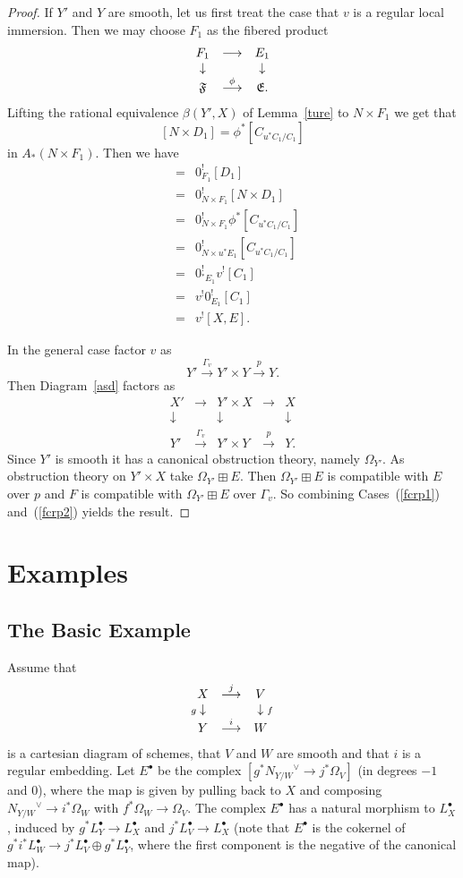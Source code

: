 \documentclass[11pt]{article}
\theoremstyle{plain}
\theoremstyle{definition}
\newenvironment{pf}{\begin{proof}}{\end{proof}}
\newcommand{\dual}[1]{{{#1}^{\vee}}}
\newcommand{\upst}{^{\ast}}
\newcommand{\upsh}{^{!}}
\newcommand{\lst}{_{\ast}}
\newcommand{\com}{^{\scriptscriptstyle\bullet}}
\newcommand{\EE}{{\mathfrak{E}}}
\newcommand{\FF}{{\mathfrak{F}}}
\newcommand{\ldiag}[1]
       {\makebox[0cm]{\({\scriptstyle#1}\downarrow\phantom{\scriptstyle#1}\)}}
\newcommand{\rdiag}[1]
       {\makebox[0cm]{\(\phantom{\scriptstyle#1}\downarrow{\scriptstyle#1}\)}}
\newcommand{\comdia}[9]{
\begin{array}{ccc}
#1 & \stackrel{#2}{\longrightarrow} & #3 \\
\ldiag{#4} & #5 & \rdiag{#6} \\
#7 & \stackrel{#8}{\longrightarrow} & #9
\end{array}}
\theoremstyle{plain}
\theoremstyle{definition}
\theoremstyle{remark}
\begin{document}
\begin{pf}
If \(Y'\) and \(Y\) are smooth, let us first treat the case that \(v\) is a
regular local immersion. Then we may choose \(F_1\) as the fibered
product
\[
\comdia{F_1}{}{E_1}{}{}{}{\FF}{\phi}{\EE.}
\]
Lifting the rational equivalence \(\beta(Y',X)\) of Lemma~\ref{ture} to
\(N\times F_1\) we get that
\[
[N\times D_1]=\phi\upst[C_{u\upst C_1/C_1}]
\]
in \(A\lst(N\times F_1)\). Then we have
\begin{eqnarray*}
[X',F_1] & = & 0_{F_1}\upsh[D_1] \\
         & = & 0_{N\times F_1}\upsh[N\times D_1] \\
         & = & 0_{N\times F_1}\upsh\phi\upst[C_{u\upst C_1/C_1}] \\
         & = & 0_{N\times u\upst E_1}\upsh[C_{u\upst C_1/C_1}] \\
         & = & 0_{\upst E_1}\upsh v\upsh[C_1] \\
         & = & v\upsh 0_{E_1}\upsh [C_1] \\
         & = & v\upsh [X,E].
\end{eqnarray*}

In the general case factor \(v\) as
\[
Y'\stackrel{\Gamma_v}{\longrightarrow} Y'\times Y
\stackrel{p}{\longrightarrow} Y.
\]
Then Diagram~\ref{asd} factors as
\[
\begin{array}{ccccc}
X' & \longrightarrow & Y'\times X & \longrightarrow & X \\
\downarrow & & \downarrow & & \downarrow \\
Y' & \stackrel{\Gamma_v}{\longrightarrow} & Y'\times Y &
\stackrel{p}{\longrightarrow} & Y.
\end{array}
\]
Since \(Y'\) is smooth it has a canonical obstruction theory, namely
\(\Omega_{Y'}\). As obstruction theory on \(Y'\times X\) take
\(\Omega_{Y'}\boxplus E\). Then \(\Omega_{Y'}\boxplus E\) is compatible
with \(E\) over \(p\) and \(F\) is compatible with \(\Omega_{Y'}\boxplus E\)
over \(\Gamma_v\). So combining Cases~(\ref{fcrp1}) and~(\ref{fcrp2})
yields the result.
\end{pf}

\section{Examples}

\subsection{The Basic Example}

Assume that
\[
\comdia{X}{j}{V}{g}{}{f}{Y}{i}{W}
\]
is a cartesian diagram of schemes, that \(V\) and \(W\) are smooth and
that \(i\) is a regular embedding. Let \(E\com\) be the complex
\([g\upst\dual{N_{Y/W}}\to j^*\Omega_V]\) (in degrees \(-1\) and \(0\)),
where the map is given by pulling back to \(X\) and composing
\(\dual{N_{Y/W}}\to i^*\Omega_W\) with \(f^*\Omega_W\to \Omega_V\). The complex
\(E\com\) has a natural morphism to \(L_X\com\), induced by \(g^*L_Y\com\to
L_X\com\) and \(j^*L_V\com\to L_X\com\) (note that \(E\com\) is the
cokernel of \(g^*i^*L_W\com\to j^*L_V\com\oplus g^*L_Y\com\), where the
first component is the negative of the canonical map).
\end{document}
